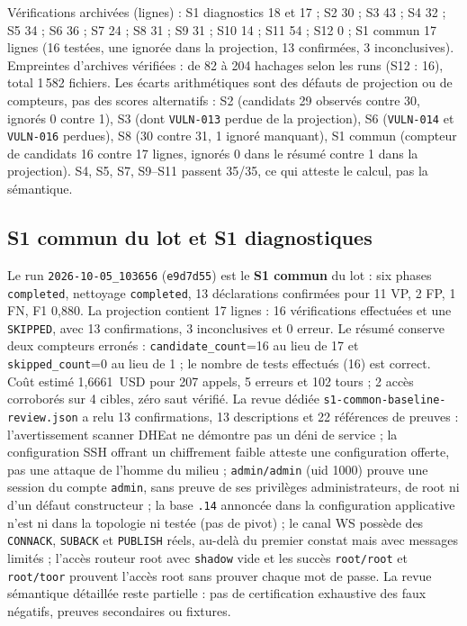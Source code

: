 \documentclass[11pt,a4paper]{article}
\newcommand{\code}[1]{{\urlstyle{tt}\nolinkurl{#1}}}
\begin{document}
V\'erifications archiv\'ees (lignes) : S1 diagnostics 18 et 17 ; S2 30 ; S3 43 ; S4 32 ; S5 34 ; S6 36 ; S7 24 ; S8 31 ; S9 31 ; S10 14 ; S11 54 ; S12 0 ; S1 commun 17 lignes (16 testées, une ignorée dans la projection, 13 confirmées, 3 inconclusives). Empreintes d'archives v\'erifi\'ees : de 82 \`a 204 hachages selon les runs (S12 : 16), total 1\,582 fichiers. Les \'ecarts arithm\'etiques sont des d\'efauts de projection ou de compteurs, pas des scores alternatifs : S2 (candidats 29 observ\'es contre 30, ignor\'es 0 contre 1), S3 (dont \code{VULN-013} perdue de la projection), S6 (\code{VULN-014} et \code{VULN-016} perdues), S8 (30 contre 31, 1 ignor\'e manquant), S1 commun (compteur de candidats 16 contre 17 lignes, ignorés 0 dans le résumé contre 1 dans la projection). S4, S5, S7, S9--S11 passent 35/35, ce qui atteste le calcul, pas la s\'emantique.
\subsection{S1 commun du lot et S1 diagnostiques}
Le run \code{2026-10-05_103656} (\code{e9d7d55}) est le \textbf{S1 commun} du lot : six phases \code{completed}, nettoyage \code{completed}, 13 d\'eclarations confirm\'ees pour 11 VP, 2 FP, 1 FN, F1 0,880. La projection contient 17 lignes : 16 vérifications effectuées et une \code{SKIPPED}, avec 13 confirmations, 3 inconclusives et 0 erreur. Le résumé conserve deux compteurs erronés : \code{candidate_count}=16 au lieu de 17 et \code{skipped_count}=0 au lieu de 1 ; le nombre de tests effectués (16) est correct. Co\^ut estim\'e 1,6661~USD pour 207 appels, 5 erreurs et 102 tours ; 2 acc\`es corrobor\'es sur 4 cibles, z\'ero saut v\'erifi\'e. La revue d\'edi\'ee \code{s1-common-baseline-review.json} a relu 13 confirmations, 13 descriptions et 22 r\'ef\'erences de preuves : l'avertissement scanner DHEat ne d\'emontre pas un d\'eni de service ; la configuration SSH offrant un chiffrement faible atteste une configuration offerte, pas une attaque de l'homme du milieu ; \code{admin/admin} (uid 1000) prouve une session du compte \code{admin}, sans preuve de ses privilèges administrateurs, de root ni d'un défaut constructeur ; la base \code{.14} annonc\'ee dans la configuration applicative n'est ni dans la topologie ni test\'ee (pas de pivot) ; le canal WS poss\`ede des \code{CONNACK}, \code{SUBACK} et \code{PUBLISH} r\'eels, au-del\`a du premier constat mais avec messages limit\'es ; l'acc\`es routeur root avec \code{shadow} vide et les succ\`es \code{root/root} et \code{root/toor} prouvent l'acc\`es root sans prouver chaque mot de passe. La revue s\'emantique d\'etaill\'ee reste partielle : pas de certification exhaustive des faux n\'egatifs, preuves secondaires ou fixtures.
\end{document}

